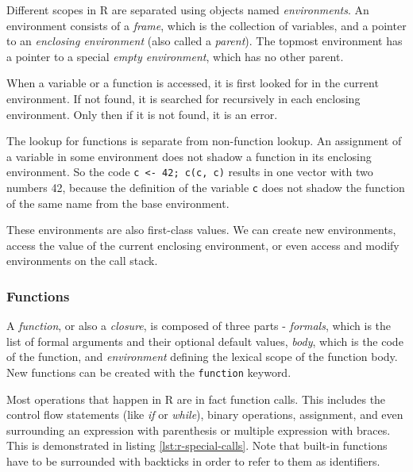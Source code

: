 Different scopes in R are separated using objects named \textit{environments}. An environment consists of a \textit{frame}, which is the collection of variables, and a pointer to an \textit{enclosing environment} (also called a \textit{parent}). The topmost environment has a pointer to a special \textit{empty environment}, which has no other parent.

When a variable or a function is accessed, it is first looked for in the current environment. If not found, it is searched for recursively in each enclosing environment. Only then if it is not found, it is an error.

The lookup for functions is separate from non-function lookup. An assignment of a variable in some environment does not shadow a function in its enclosing environment. So the code \texttt{c <- 42; c(c, c)} results in one vector with two numbers 42, because the definition of the variable \texttt{c} does not shadow the function of the same name from the base environment.

These environments are also first-class values. We can create new environments, access the value of the current enclosing environment, or even access and modify environments on the call stack.

\subsubsection*{Functions}

A \textit{function}, or also a \textit{closure}, is composed of three parts - \textit{formals}, which is the list of formal arguments and their optional default values, \textit{body}, which is the code of the function, and \textit{environment} defining the lexical scope of the function body. New functions can be created with the \texttt{function} keyword.

Most operations that happen in R are in fact function calls. This includes the control flow statements (like \textit{if} or \textit{while}), binary operations, assignment, and even surrounding an expression with parenthesis or multiple expression with braces. This is demonstrated in listing \ref{lst:r-special-calls}. Note that built-in functions have to be surrounded with backticks in order to refer to them as identifiers.

